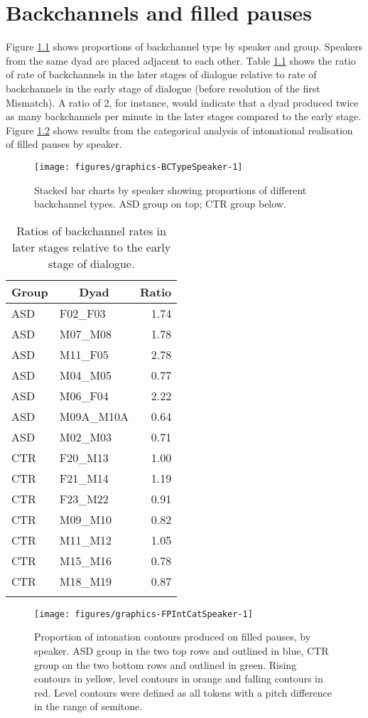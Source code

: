 \chapter{Backchannels and filled pauses}\label{appendix:c}
Figure \ref{fig:BCTypeSpeaker} shows proportions of backchannel type by
speaker and group. Speakers from the same dyad are placed adjacent to each other.
Table \ref{tab:BCRateRatio} shows the ratio of rate of backchannels in
the later stages of dialogue relative to rate of backchannels in the
early stage of dialogue (before resolution of the first Mismatch). A
ratio of 2, for instance, would indicate that a dyad produced twice as
many backchannels per minute in the later stages compared to the early
stage.
Figure \ref{fig:FPIntCatSpeaker} shows results from the categorical
analysis of intonational realisation of filled pauses by speaker.

\begin{figure}
\texttt{[image: figures/graphics-BCTypeSpeaker-1]}
\caption{Stacked bar charts by speaker showing proportions of
different backchannel types. ASD group on top; CTR group below.}\label{fig:BCTypeSpeaker}
\end{figure}

\begin{table}
\caption{\label{tab:BCRateRatio}Ratios of backchannel rates in later stages relative
to the early stage of dialogue.}
\begin{tabularx}{.8\textwidth}{XXr}
\lsptoprule
Group & \multicolumn{1}{c}{Dyad} & \multicolumn{1}{c}{Ratio}\\
\midrule
ASD & F02\_F03 & 1.74\\
ASD & M07\_M08 & 1.78\\
ASD & M11\_F05 & 2.78\\
ASD & M04\_M05 & 0.77\\
ASD & M06\_F04 & 2.22\\
ASD & M09A\_M10A & 0.64\\
ASD & M02\_M03 & 0.71\\
CTR & F20\_M13 & 1.00\\
CTR & F21\_M14 & 1.19\\
CTR & F23\_M22 & 0.91\\
CTR & M09\_M10 & 0.82\\
CTR & M11\_M12 & 1.05\\
CTR & M15\_M16 & 0.78\\
CTR & M18\_M19 & 0.87\\
\lspbottomrule
\end{tabularx}
\end{table}

\begin{figure}
\texttt{[image: figures/graphics-FPIntCatSpeaker-1]}
\caption{Proportion of intonation contours produced on
filled pauses, by speaker. ASD group in the two top rows and outlined in
blue, CTR group on the two bottom rows and outlined in green. Rising
contours in yellow, level contours in orange and falling contours in
red. Level contours were defined as all tokens with a pitch difference
in the range of  semitone.}\label{fig:FPIntCatSpeaker}
\end{figure}


